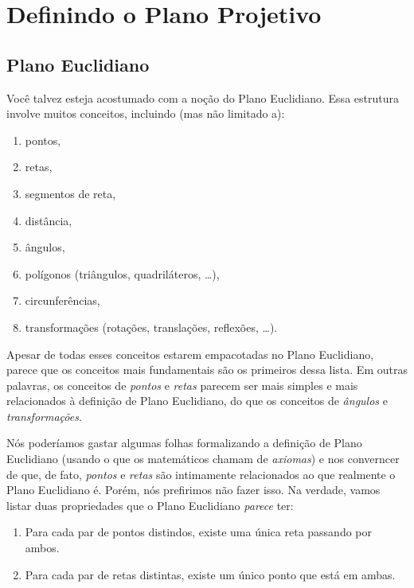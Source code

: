 \chapter{Definindo o Plano Projetivo}

\section{Plano Euclidiano}

Você talvez esteja acostumado com a noção do Plano Euclidiano.
Essa estrutura involve muitos conceitos, incluindo (mas não limitado a):
\begin{enumerate}[label = \textbullet]
	\item pontos,
	\item retas,
	\item segmentos de reta,
	\item distância,
	\item ângulos,
	\item polígonos (triângulos, quadriláteros, \dots),
	\item circunferências,
	\item transformações (rotações, translações, reflexões, \dots).
\end{enumerate}

Apesar de todas esses conceitos estarem empacotadas no Plano Euclidiano, parece que os conceitos mais fundamentais são os primeiros dessa lista.
Em outras palavras, os conceitos de \emph{pontos} e \emph{retas} parecem ser mais simples e mais relacionados à definição de Plano Euclidiano, do que os conceitos de \emph{ângulos} e \emph{transformações}.

Nós poderíamos gastar algumas folhas formalizando a definição de Plano Euclidiano (usando o que os matemáticos chamam de \emph{axiomas}) e nos converncer de que, de fato, \emph{pontos} e \emph{retas} são intimamente relacionados ao que realmente o Plano Euclidiano é.
Porém, nós prefirimos não fazer isso.
Na verdade, vamos listar duas propriedades que o Plano Euclidiano \emph{parece} ter:
\begin{enumerate}[label = (\textit{\roman*})]
	\item Para cada par de pontos distindos, existe uma única reta passando por ambos. \label{item:pe:i}
	\item Para cada par de retas distintas, existe um único ponto que está em ambas. \label{item:pe:ii}
\end{enumerate}

